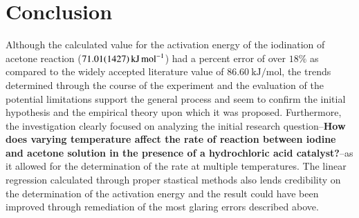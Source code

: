 \section{Conclusion}
Although the calculated value for the activation energy of the iodination of acetone reaction ($\SI{71.01\pm14.27}{\kilo\joule\per\mole}$) had a percent error of over $18\%$ as compared to the widely accepted literature value of $\SI{86.60}{\kilo\joule\per\mole}$, the trends determined through the course of the experiment and the evaluation of the potential limitations support the general process and seem to confirm the initial hypothesis and the empirical theory upon which it was proposed. Furthermore, the investigation clearly focused on analyzing the initial research question--\textbf{How does varying temperature affect the rate of reaction between iodine and acetone solution in the presence of a hydrochloric acid catalyst?}--as it allowed for the determination of the rate at multiple temperatures. The linear regression calculated through proper stastical methods also lends credibility on the determination of the activation energy and the result could have been improved through remediation of the most glaring errors described above.